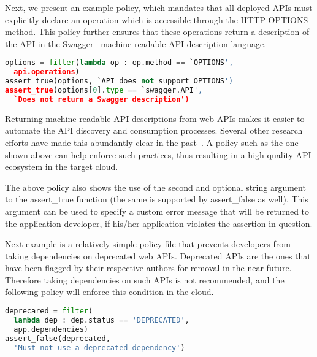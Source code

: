 Next, we present an example policy, which mandates that all deployed APIs must explicitly
declare an operation which is accessible through the HTTP OPTIONS method. This policy further ensures
that these operations return a description of the API in the Swagger~\cite{hl:swagger} machine-readable API
description language.

\vspace{0.05in}
{\footnotesize
\begin{lstlisting}[language=Python, frame=single, showstringspaces=false]
options = filter(lambda op : op.method == `OPTIONS',  
  api.operations)
assert_true(options, `API does not support OPTIONS')
assert_true(options[0].type == `swagger.API', 
  `Does not return a Swagger description')
\end{lstlisting}
}
\vspace{0.05in}

Returning machine-readable API descriptions from web APIs 
makes it easier to automate the API discovery and consumption processes. Several other
research efforts have made this abundantly clear in the past~\cite{Verborgh:2012:FDB:2307819.2307828,Steiner:2011:FHC:1967428.1967433}. 
A policy such as the one
shown above can help enforce such practices, thus resulting in a high-quality
API ecosystem in the target cloud. 

The above policy also shows the use of the second and
optional string argument to the assert\_true function (the same is supported by assert\_false as well). 
This argument can be used to specify
a custom error message that will be returned to the application developer, if his/her application
violates the assertion in question.

Next example is a relatively simple policy file that prevents developers from taking
dependencies on deprecated web APIs. Deprecated APIs are the ones that have been flagged
by their respective authors for removal in the near future. Therefore taking dependencies on such
APIs is not recommended, and the following policy will enforce this condition in the cloud.

\vspace{0.05in}
{\footnotesize
\begin{lstlisting}[language=Python, frame=single, showstringspaces=false]
deprecared = filter(
  lambda dep : dep.status == 'DEPRECATED', 
  app.dependencies)
assert_false(deprecated, 
  'Must not use a deprecated dependency')
\end{lstlisting}
}
\vspace{0.05in}

